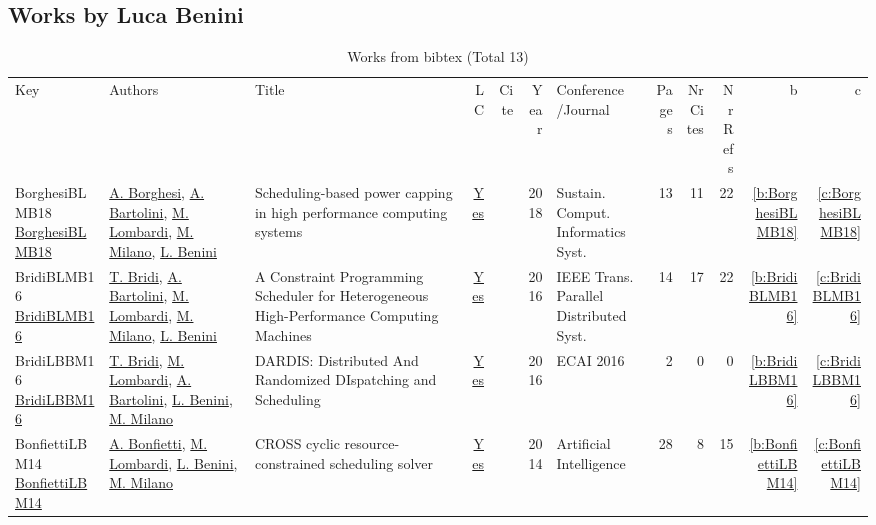 \subsection{Works by Luca Benini}
\label{sec:a248}
{\scriptsize
\begin{longtable}{>{\raggedright\arraybackslash}p{3cm}>{\raggedright\arraybackslash}p{6cm}>{\raggedright\arraybackslash}p{6.5cm}rrrp{2.5cm}rrrrr}
\rowcolor{white}\caption{Works from bibtex (Total 13)}\\ \toprule
\rowcolor{white}Key & Authors & Title & LC & Cite & Year & \shortstack{Conference\\/Journal} & Pages & \shortstack{Nr\\Cites} & \shortstack{Nr\\Refs} & b & c \\ \midrule\endhead
\bottomrule
\endfoot
BorghesiBLMB18 \href{https://doi.org/10.1016/j.suscom.2018.05.007}{BorghesiBLMB18} & \hyperref[auth:a232]{A. Borghesi}, \hyperref[auth:a231]{A. Bartolini}, \hyperref[auth:a143]{M. Lombardi}, \hyperref[auth:a144]{M. Milano}, \hyperref[auth:a248]{L. Benini} & Scheduling-based power capping in high performance computing systems & \href{works/BorghesiBLMB18.pdf}{Yes} & \cite{BorghesiBLMB18} & 2018 & Sustain. Comput. Informatics Syst. & 13 & 11 & 22 & \ref{b:BorghesiBLMB18} & \ref{c:BorghesiBLMB18}\\
BridiBLMB16 \href{https://doi.org/10.1109/TPDS.2016.2516997}{BridiBLMB16} & \hyperref[auth:a233]{T. Bridi}, \hyperref[auth:a231]{A. Bartolini}, \hyperref[auth:a143]{M. Lombardi}, \hyperref[auth:a144]{M. Milano}, \hyperref[auth:a248]{L. Benini} & A Constraint Programming Scheduler for Heterogeneous High-Performance Computing Machines & \href{works/BridiBLMB16.pdf}{Yes} & \cite{BridiBLMB16} & 2016 & {IEEE} Trans. Parallel Distributed Syst. & 14 & 17 & 22 & \ref{b:BridiBLMB16} & \ref{c:BridiBLMB16}\\
BridiLBBM16 \href{https://doi.org/10.3233/978-1-61499-672-9-1598}{BridiLBBM16} & \hyperref[auth:a233]{T. Bridi}, \hyperref[auth:a143]{M. Lombardi}, \hyperref[auth:a231]{A. Bartolini}, \hyperref[auth:a248]{L. Benini}, \hyperref[auth:a144]{M. Milano} & {DARDIS:} Distributed And Randomized DIspatching and Scheduling & \href{works/BridiLBBM16.pdf}{Yes} & \cite{BridiLBBM16} & 2016 & ECAI 2016 & 2 & 0 & 0 & \ref{b:BridiLBBM16} & \ref{c:BridiLBBM16}\\
BonfiettiLBM14 \href{https://doi.org/10.1016/j.artint.2013.09.006}{BonfiettiLBM14} & \hyperref[auth:a204]{A. Bonfietti}, \hyperref[auth:a143]{M. Lombardi}, \hyperref[auth:a248]{L. Benini}, \hyperref[auth:a144]{M. Milano} & {CROSS} cyclic resource-constrained scheduling solver & \href{works/BonfiettiLBM14.pdf}{Yes} & \cite{BonfiettiLBM14} & 2014 & Artificial Intelligence & 28 & 8 & 15 & \ref{b:BonfiettiLBM14} & \ref{c:BonfiettiLBM14}\\

\end{longtable}}

